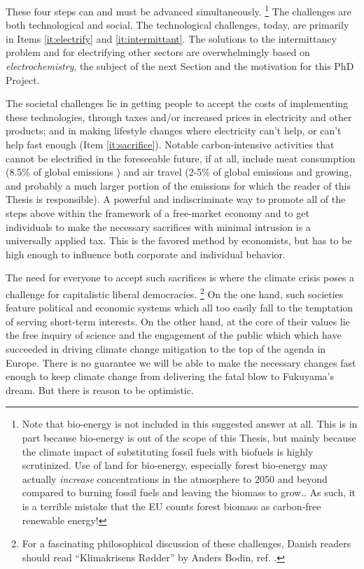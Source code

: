 These four steps can and must be advanced simultaneously.
\footnote{Note that bio-energy is not included in this suggested answer at all. This is in part because bio-energy is out of the scope of this Thesis, but mainly because the climate impact of substituting fossil fuels with biofuels is highly scrutinized. Use of land for bio-energy, especially forest bio-energy may actually \textit{increase}  concentrations in the atmosphere to 2050 and beyond compared to burning fossil fuels and leaving the biomass to grow.\cite{Searchinger2018, Bentsen2017}. As such, it is a terrible mistake that the EU counts forest biomass as carbon-free renewable energy!}
The challenges are both technological and social. The technological challenges, today, are primarily in Items \ref{it:electrify} and \ref{it:intermittant}. The solutions to the intermittancy problem and for electrifying other sectors are overwhelmingly based on \textit{electrochemistry}, the subject of the next Section and the motivation for this PhD Project.

The societal challenges lie in getting people to accept the costs of implementing these technologies, through taxes and/or increased prices in electricity and other products; and in making lifestyle changes where electricity can't help, or can't help fast enough (Item \ref{it:sacrifice}). Notable carbon-intensive activities that cannot be electrified in the foreseeable future, if at all, include meat consumption (8.5\% of global emissions \cite{Caro2017}) and air travel (2-5\% of global emissions and growing\cite{CarbonBrief_aviation, Larsson2018}, and probably a much larger portion of the emissions for which the reader of this Thesis is responsible). A powerful and indiscriminate way to promote all of the steps above within the framework of a free-market economy and to get individuals to make the necessary sacrifices with minimal intrusion is a universally applied  tax. This is the favored method by economists\cite{CarbonTax_Economist}, but has to be high enough to influence both corporate and individual behavior.

The need for everyone to accept such sacrifices is where the climate crisis poses a challenge for capitalistic liberal democracies.
\footnote{For a fascinating philosophical discussion of these challenges, Danish readers should read ``Klimakrisens R\o dder'' by Anders Bodin, ref. \cite{Bodin2019}.} 
On the one hand, such societies feature political and economic systems which all too easily fall to the temptation of serving short-term interests. On the other hand, at the core of their values lie the free inquiry of science and the engagement of the public which which have succeeded in driving climate change mitigation to the top of the agenda in Europe. There is no guarantee we will be able to make the necessary changes fast enough to keep climate change from delivering the fatal blow to Fukuyama's dream. But there is reason to be optimistic.


